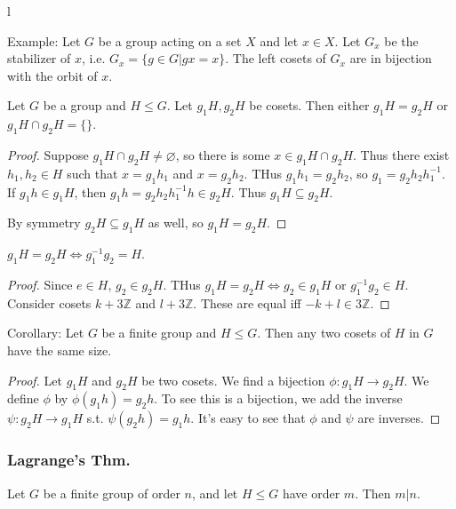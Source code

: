 l\documentclass{scrartcl}
\begin{document}
Example: Let $G$ be a group acting on a set $X$ and let $x \in X$. Let $G_x$ be the stabilizer of $x$, i.e. $G_x = \{ g \in G | gx = x \}$. The left cosets of $G_x$ are in bijection with the orbit of $x$.

\begin{proposition}
    Let $G$ be a group and $H \le G$. Let $g_1H, g_2H$ be cosets. Then either $g_1H = g_2H$ or $g_1H \cap g_2H = \{\}$.
\end{proposition}

\begin{proof}
    Suppose $g_1H \cap g_2 H \neq \varnothing$, so there is some $x \in g_1H \cap g_2H$. Thus there exist $h_1,h_2 \in H$ such that $x = g_1h_1$ and $x = g_2h_2$. THus $g_1h_1 = g_2h_2$, so $g_1 = g_2h_2h_1^{-1}$. If $g_1h \in g_1H$, then $g_1h = g_2h_2h_1^{-1}h \in g_2H$. Thus $g_1H \subseteq g_2H$.
    
    By symmetry $g_2H \subseteq g_1H$ as well, so $g_1H = g_2H$.
\end{proof}

\begin{proposition}
    $g_1H = g_2H \iff g_1^{-1}g_2 = H$.
\end{proposition}

\begin{proof}
    Since $e \in H$, $g_2 \in g_2H$. THus $g_1H = g_2H \iff g_2 \in g_1H$ or $g_1^{-1}g_2 \in H$. Consider cosets $k + 3\mathbb{Z}$ and $l + 3\mathbb{Z}$. These are equal iff $-k + l \in 3\mathbb{Z}$. 
\end{proof}

\begin{proposition}
    Corollary: Let $G$ be a finite group and $H \le G$. Then any two cosets of $H$ in $G$ have the same size. 
\end{proposition}

\begin{proof}
    Let $g_1H$ and $g_2H$ be two cosets. We find a bijection $\phi : g_1H \rightarrow g_2H$. We define $\phi$ by $\phi(g_1h) = g_2h$. To see this is a bijection, we add the inverse $\psi : g_2H \rightarrow g_1H$ s.t. $\psi(g_2h) = g_1h$. It's easy to see that $\phi$ and $\psi$ are inverses.
\end{proof}

\subsubsection{Lagrange's Thm.}
\begin{theorem}[Lagrange]
    Let $G$ be a finite group of order $n$, and let $H \le G$ have order $m$. Then $m | n$. 
\end{theorem}
\end{document}
